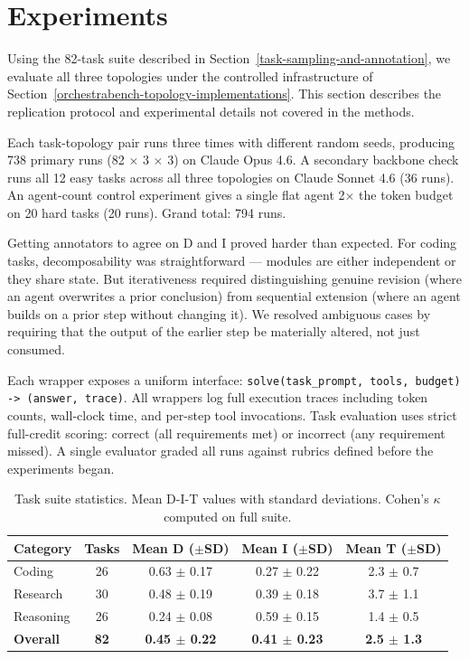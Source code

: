 \section{Experiments}

Using the 82-task suite described in Section~\ref{task-sampling-and-annotation}, we evaluate all three topologies under the controlled infrastructure of Section~\ref{orchestrabench-topology-implementations}. This section describes the replication protocol and experimental details not covered in the methods.

Each task-topology pair runs three times with different random seeds, producing 738 primary runs (82 $\times$ 3 $\times$ 3) on Claude Opus 4.6. A secondary backbone check runs all 12 easy tasks across all three topologies on Claude Sonnet 4.6 (36 runs). An agent-count control experiment gives a single flat agent 2$\times$ the token budget on 20 hard tasks (20 runs). Grand total: 794 runs.

Getting annotators to agree on D and I proved harder than expected. For coding tasks, decomposability was straightforward --- modules are either independent or they share state. But iterativeness required distinguishing genuine revision (where an agent overwrites a prior conclusion) from sequential extension (where an agent builds on a prior step without changing it). We resolved ambiguous cases by requiring that the output of the earlier step be materially altered, not just consumed.

Each wrapper exposes a uniform interface: \texttt{solve(task\_prompt, tools, budget) -> (answer, trace)}. All wrappers log full execution traces including token counts, wall-clock time, and per-step tool invocations. Task evaluation uses strict full-credit scoring: correct (all requirements met) or incorrect (any requirement missed). A single evaluator graded all runs against rubrics defined before the experiments began.

\begin{table}[t]
\centering
\caption{Task suite statistics. Mean D-I-T values with standard deviations. Cohen's $\kappa$ computed on full suite.}
\label{tab:benchmark_statistics}
\small
\begin{tabular}{lcccc}
\toprule
Category & Tasks & Mean D ($\pm$SD) & Mean I ($\pm$SD) & Mean T ($\pm$SD) \\
\midrule
Coding & 26 & 0.63 $\pm$ 0.17 & 0.27 $\pm$ 0.22 & 2.3 $\pm$ 0.7 \\
Research & 30 & 0.48 $\pm$ 0.19 & 0.39 $\pm$ 0.18 & 3.7 $\pm$ 1.1 \\
Reasoning & 26 & 0.24 $\pm$ 0.08 & 0.59 $\pm$ 0.15 & 1.4 $\pm$ 0.5 \\
\midrule
\textbf{Overall} & \textbf{82} & \textbf{0.45 $\pm$ 0.22} & \textbf{0.41 $\pm$ 0.23} & \textbf{2.5 $\pm$ 1.3} \\
\bottomrule
\end{tabular}
\end{table}

